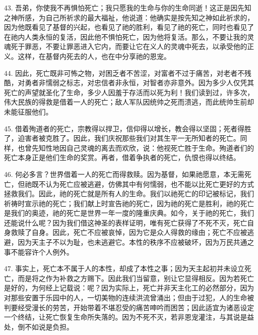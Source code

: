 43. 吾弟，你使我不再惧怕死亡；我只愿我的生命与你的生命同逝！这正是因先知之神所感，为自己所祈求的最大福祉，他说道：他确实是按先知之神如此祈求的，因为他既看见了基督的兴起，也看见了祂的胜利，看见了祂的死亡，同时也看见了在祂内人类永恒的复活，因此他不惧怕死亡，因为他将复活。那么，不要让我的灵魂死于罪恶，不要让罪恶进入它内，而要让它在义人的灵魂中死去，以承受他的正义。这样，在基督内死去的人，也在中分享祂的恩宠。\par

44. 因此，死亡既非可怖之物，对困乏者不苦涩，对富者不过于痛苦，对老者不残酷，对勇者非懦弱之标志，对忠信者非永恒，对智者亦非意外。因为多少人仅凭其死亡的声望就圣化了生命，多少人因羞于存活而以死为利！我们读到过，许多次，伟大民族的得救是借着一人的死亡；敌人军队因统帅之死而溃逃，而此统帅生前却未能征服他们。\par

45. 借着殉道者的死亡，宗教得以捍卫，信仰得以增长，教会得以坚固；死者得胜了，迫害者被克胜了。因此，我们庆祝那些我们对其生平一无所知者的死亡。同样，也曾先知性地因自己灵魂的离去而欢欣，说：他视死亡胜于生命。殉道者们的死亡本身正是他们生命的奖赏。再者，借着争执者的死亡，仇恨也得以终结。\par

46. 何必多言？世界借着一人的死亡而得救赎。因为基督，如果祂愿意，本无需死亡，但祂既不认为死亡应被逃避，仿佛其中有何懦弱，也不能以比死亡更好的方式拯救我们。因此，祂的死亡就是所有人的生命。我们以祂死亡的印记被标记，我们祈祷时宣示祂的死亡；我们献上时宣告祂的死亡，因为祂的死亡是胜利，祂的死亡是我们的奥迹，祂的死亡是世界一年一度的隆重庆典。如今，关于祂的死亡，我们还能说什么呢？因为我们借这神圣的表样证明，唯有死亡获得了不死不灭，死亡自身救赎了自身。因此，死亡不应被哀悼，因为它是众人得救的缘由；死亡不应被逃避，因为天主子不以为耻，也未逃避它。本性的秩序不应被破坏，因为万民共通之事不能容许个人例外。\par

47. 事实上，死亡本不属于人的本性，却成了本性之事；因为天主起初并未设立死亡，而是将之作为补救之方赐下。因此我们当留意，别让它显得相反。因为若死亡是好的，为何经上记载说：呢？因为实际上，死亡并非天主化工的必然部分，因为对那些安置于乐园中的人，一切美物的连续洪流曾涌出；但由于过犯，人的生命被判要经受漫长的劳苦，开始带着不堪忍受的痛苦呻吟而困苦；因此适宜为诸恶设定一个终结，让死亡恢复生命所失落的。因为不死不灭，若非恩宠灌注，与其说是益处，倒不如说是负担。\par

